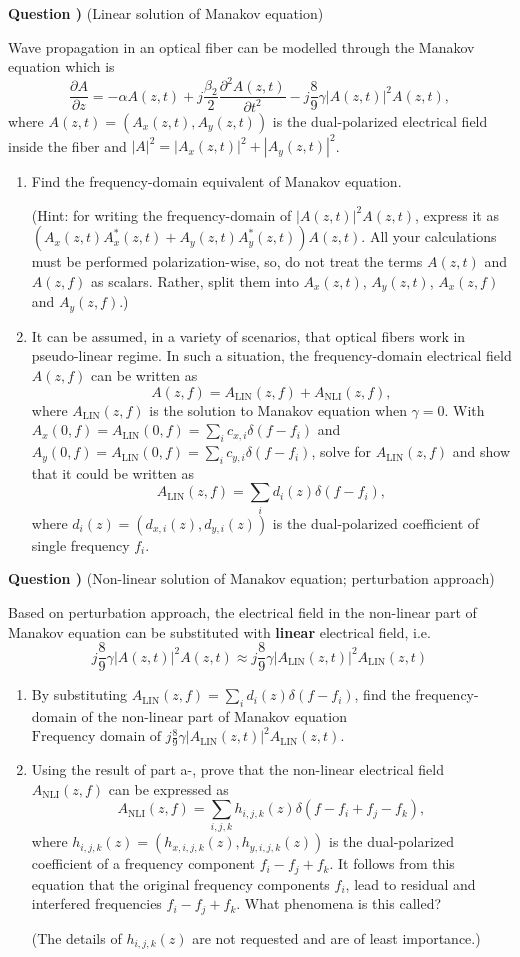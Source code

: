 \documentclass[10pt,letterpaper]{article}
\newcounter{QuestionNumber}
\newcommand{\Q}{
\textbf{Question \theQuestionNumber)}
\stepcounter{QuestionNumber}
}
\begin{document}
\Q (Linear solution of Manakov equation)

Wave propagation in an optical fiber can be modelled through the Manakov equation which is
$$
\frac{\partial A}{\partial z}
=
-\alpha A(z,t)
+
j\frac{\beta_2}{2}\frac{\partial^2 A(z,t)}{\partial t^2}
-
j\frac{8}{9}\gamma |A(z,t)|^2A(z,t),
$$
where $A(z,t)=(A_x(z,t),A_y(z,t))$ is the dual-polarized electrical field inside the fiber and $|A|^2=|A_x(z,t)|^2+|A_y(z,t)|^2$.
\begin{enumerate}[label=\alph*-]
\item
Find the frequency-domain equivalent of Manakov equation.

(Hint: for writing the frequency-domain of $|A(z,t)|^2A(z,t)$, express it as $(A_x(z,t)A_x^*(z,t)+A_y(z,t)A_y^*(z,t))A(z,t)$. All your calculations must be performed polarization-wise, so, do not treat the terms $A(z,t)$ and $A(z,f)$ as scalars. Rather, split them into $A_x(z,t)$, $A_y(z,t)$, $A_x(z,f)$ and $A_y(z,f)$.)
\item
It can be assumed, in a variety of scenarios, that optical fibers work in pseudo-linear regime. In such a situation, the frequency-domain electrical field $A(z,f)$ can be written as 
$$
A(z,f)=A_\text{LIN}(z,f)+A_\text{NLI}(z,f)
,
$$
where $A_\text{LIN}(z,f)$ is the solution to Manakov equation when $\gamma=0$. With $A_x(0,f)=A_\text{LIN}(0,f)=\sum_i c_{x,i}\delta(f-f_i)$ and $A_y(0,f)=A_\text{LIN}(0,f)=\sum_i c_{y,i}\delta(f-f_i)$, solve for $A_\text{LIN}(z,f)$ and show that it could be written as
$$
A_\text{LIN}(z,f)=\sum_i d_i(z)\delta(f-f_i)
,
$$
where $d_i(z)=(d_{x,i}(z),d_{y,i}(z))$ is the dual-polarized coefficient of single frequency $f_i$.
\end{enumerate}

\Q (Non-linear solution of Manakov equation; perturbation approach)

Based on perturbation approach, the electrical field in the non-linear part of Manakov equation can be substituted with \textbf{linear} electrical field, i.e.
$$
j\frac{8}{9}\gamma |A(z,t)|^2A(z,t)
\approx
j\frac{8}{9}\gamma |A_\text{LIN}(z,t)|^2A_\text{LIN}(z,t)
$$
\begin{enumerate}[label=\alph*-]
\item
By substituting $A_\text{LIN}(z,f)=\sum_i d_i(z)\delta(f-f_i)$, find the frequency-domain of the non-linear part of Manakov equation
$
\text{Frequency domain of }j\frac{8}{9}\gamma |A_\text{LIN}(z,t)|^2A_\text{LIN}(z,t)
.
$
\item
Using the result of part a-, prove that the non-linear electrical field $A_\text{NLI}(z,f)$ can be expressed as
$$
A_\text{NLI}(z,f)=\sum_{i,j,k} h_{i,j,k}(z)\delta(f-f_i+f_j-f_k)
,
$$
where
$h_{i,j,k}(z)=(h_{x,i,j,k}(z),h_{y,i,j,k}(z))$ is the dual-polarized coefficient of a frequency component $f_i-f_j+f_k$.
It follows from this equation that the original frequency components $f_i$, lead to residual and interfered frequencies $f_i-f_j+f_k$. What phenomena is this called?

(The details of $h_{i,j,k}(z)$ are not requested and are of least importance.)
\end{enumerate}
\end{document}
